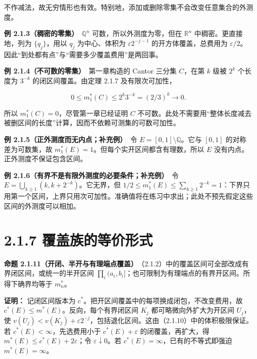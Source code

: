 \documentclass[11pt,a4paper]{article}
\begin{document}
不作减法，故无穷情形也有效。特别地，添加或删除零集不会改变任意集合的外测度。

\textbf{例 2.1.3（稠密的零集）}　\(\mathbb Q^n\)
可数，所以外测度为零，但在 \(\mathbb R^n\) 中稠密。更直接地，列为
\(\{q_j\}\)，用以 \(q_j\) 为中心、体积为 \(\varepsilon2^{-j-1}\)
的开方体覆盖，总费用为
\(\varepsilon/2\)。因此``到处都有点''与``需要多少覆盖费用''是两回事。

\textbf{例 2.1.4（不可数的零集）}　第一章构造的 Cantor 三分集
\(C\)，在第 \(k\) 级被 \(2^k\) 个长度为 \(3^{-k}\) 的闭区间覆盖。由定理
2.1.7 及有限次可加性，

\begin{equation*}
0\le m_1^*(C)\le2^k3^{-k}=(2/3)^k\longrightarrow0.
\tag{2.1.16}
\end{equation*}

所以 \(m_1^*(C)=0\)，尽管第一章已经证明 \(C\)
不可数。此处不需要用``整体长度减去被删区间的长度''计算，因而不依赖可测集的可数可加性。

\textbf{例 2.1.5（正外测度而无内点；补充例）}　令
\(E=[0,1]\setminus\mathbb Q\)。它与 \([0,1]\) 的对称差为可数集，故
\(m_1^*(E)=1\)。但每个实开区间都含有理数，所以 \(E\)
没有内点。正外测度不保证包含区间。

\textbf{例 2.1.6（有界不是有限外测度的必要条件；补充例）}　令
\(E=\bigcup_{k\ge1}(k,k+2^{-k})\)。它无界，但
\(1/2\le m_1^*(E)\le\sum_{k\ge1}2^{-k}=1\)：下界只用第一个区间，上界只用次可加性。准确值将在练习中求出；此处不预先假定这些区间的外测度可以相加。

\section[\S{}2.1.7
覆盖族的等价形式]{2.1.7
覆盖族的等价形式}\label{ux8986ux76d6ux65cfux7684ux7b49ux4ef7ux5f62ux5f0f}

\textbf{命题
2.1.11（开闭、半开与有理端点覆盖）}　（2.1.2）中的覆盖区间可全部改成有界闭区间，或统一的半开区间
\(\prod_i(a_i,b_i]\)；也可限制为有理端点的有界开区间。所得下确界均等于
\(m_n^*\)。

\textbf{证明：} 记闭区间版本为
\(c^*\)。把开区间覆盖中的每项换成闭包，不改变费用，故
\(c^*(E)\le m^*(E)\)。反向，每个有界闭区间 \(K_j\)
都可略微向外扩大为开区间 \(U_j\)，使
\(v(U_j)<v(K_j)+\varepsilon2^{-j}\)，包括退化区间。这由（2.1.10）中的体积极限保证。若
\(c^*(E)<\infty\)，先选费用小于 \(c^*(E)+\varepsilon\)
的闭覆盖，再扩大，得 \(m^*(E)\le c^*(E)+2\varepsilon\)；令
\(\varepsilon\downarrow0\)。若 \(c^*(E)=\infty\)，已有的不等式即强迫
\(m^*(E)=\infty\)。
\end{document}
